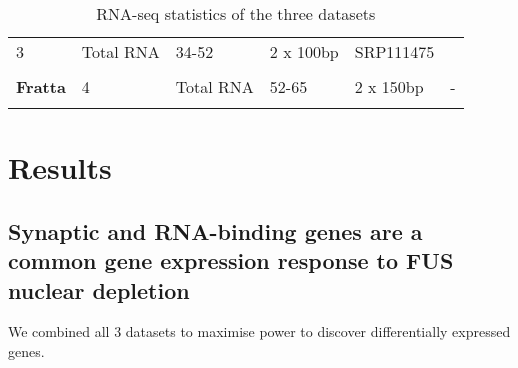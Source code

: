 \begin{longtable}[]{@{}llllll@{}}
\begin{minipage}[t]{0.14\columnwidth}
		{3}\strut
	\end{minipage} & \begin{minipage}[t]{0.14\columnwidth}\raggedright\strut
		{Total RNA}\strut
	\end{minipage} & \begin{minipage}[t]{0.14\columnwidth}\raggedright\strut
		{34-52}\strut
	\end{minipage} & \begin{minipage}[t]{0.14\columnwidth}\raggedright\strut
		{2 x 100bp}\strut
	\end{minipage} & \begin{minipage}[t]{0.14\columnwidth}\raggedright\strut
		{SRP111475}\strut
	\end{minipage}\tabularnewline \\
	\begin{minipage}[t]{0.14\columnwidth}\raggedright\strut
		{\textbf{Fratta} }\strut
	\end{minipage} & \begin{minipage}[t]{0.14\columnwidth}\raggedright\strut
		{4}\strut
	\end{minipage} & \begin{minipage}[t]{0.14\columnwidth}\raggedright\strut
		{Total RNA}\strut
	\end{minipage} & \begin{minipage}[t]{0.14\columnwidth}\raggedright\strut
		{52-65}\strut
	\end{minipage} & \begin{minipage}[t]{0.14\columnwidth}\raggedright\strut
		{2 x 150bp}\strut
	\end{minipage} & \begin{minipage}[t]{0.14\columnwidth}\raggedright\strut
		{-}\strut
	\end{minipage}\tabularnewline
	\bottomrule
	\caption{RNA-seq statistics of the three datasets}
	\label{tab:fus_sequencing}
\end{longtable}



\section{Results}

\subsection{Synaptic and RNA-binding genes are a common gene expression response to FUS nuclear depletion}
We combined all 3 datasets to maximise power to discover differentially expressed genes. 

